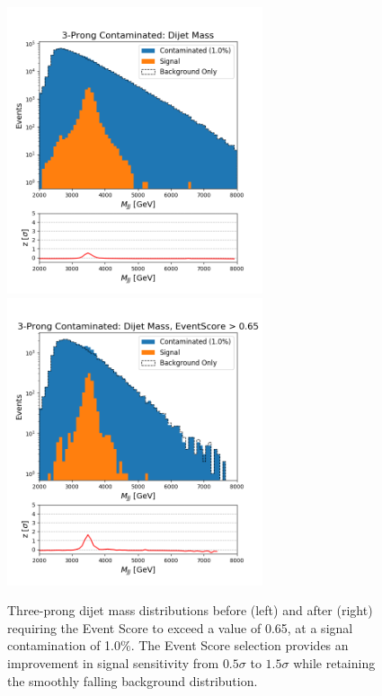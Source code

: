 \documentclass[11pt, a4paper]{article}
\begin{document}
\begin{figure}[H]
	\begin{center}
		\includegraphics[width=213pt]{imgs/3Prong_Contaminated_1p0_JJ_Mass_Multi_SaveForPaper_Lead.png}
		\includegraphics[width=213pt]{imgs/3Prong_Contaminated_1p0_JJ_Mass_EventScore0p65_Multi_SaveForPaper_Lead.png}
	\end{center}
	\caption{Three-prong dijet mass distributions before (left) and after (right) requiring the Event Score to exceed a value of 0.65, at a signal contamination of 1.0\%. The Event Score selection provides an improvement in signal sensitivity from $0.5\sigma$ to $1.5\sigma$ while retaining the smoothly falling background distribution.}
	\label{fig:3p_dijet}
\end{figure}



\end{document}
